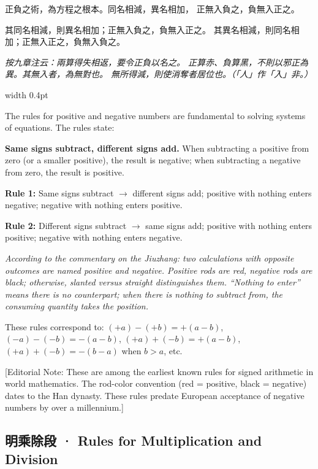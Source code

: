 \documentclass[10pt,a4paper]{article}
\newlength{\cnwidth}
\newlength{\enwidth}
\newcommand{\bilingual}[2]{%
  \noindent%
  \begin{minipage}[t]{\cnwidth}%
    #1%
  \end{minipage}%
  \hfill\vrule width 0.4pt\hfill%
  \begin{minipage}[t]{\enwidth}%
    #2%
  \end{minipage}%
  \par\smallskip%
}
\newcommand{\bilingualsubsection}[2]{%
  \subsection*{#1 · #2}
}
\newcommand{\transnote}[1]{%
  \par\smallskip\noindent\textcolor{notecolor}{\small[Editorial Note: #1]}\par\smallskip
}
\begin{document}
\bilingual{%
  正負之術，為方程之根本。同名相減，異名相加，
  正無入負之，負無入正之。

  其同名相減，則異名相加；正無入負之，負無入正之。
  其異名相減，則同名相加；正無入正之，負無入負之。

  \textit{按九章注云：兩算得失相返，要令正負以名之。
  正算赤、負算黑，不則以邪正為異。其無入者，為無對也。
  無所得減，則使消奪者居位也。（「人」作「入」非。）}
}{%
  The rules for positive and negative numbers are fundamental to solving systems
  of equations. The rules state:

  \textbf{Same signs subtract, different signs add.} When subtracting a positive
  from zero (or a smaller positive), the result is negative; when subtracting a
  negative from zero, the result is positive.

  \textbf{Rule 1:} Same signs subtract $\rightarrow$ different signs add;
  positive with nothing enters negative; negative with nothing enters positive.

  \textbf{Rule 2:} Different signs subtract $\rightarrow$ same signs add;
  positive with nothing enters positive; negative with nothing enters negative.

  \textit{According to the commentary on the Jiuzhang: two calculations with opposite
  outcomes are named positive and negative. Positive rods are red, negative rods are black;
  otherwise, slanted versus straight distinguishes them. ``Nothing to enter'' means there
  is no counterpart; when there is nothing to subtract from, the consuming quantity
  takes the position.}

  These rules correspond to: $(+a) - (+b) = +(a-b)$, $(-a) - (-b) = -(a-b)$,
  $(+a) + (-b) = +(a-b)$, $(+a) + (-b) = -(b-a)$ when $b > a$, etc.
}

\transnote{These are among the earliest known rules for signed arithmetic in world mathematics.
The rod-color convention (red = positive, black = negative) dates to the Han dynasty.
These rules predate European acceptance of negative numbers by over a millennium.}

\bilingualsubsection{明乘除段}{Rules for Multiplication and Division}
\end{document}
